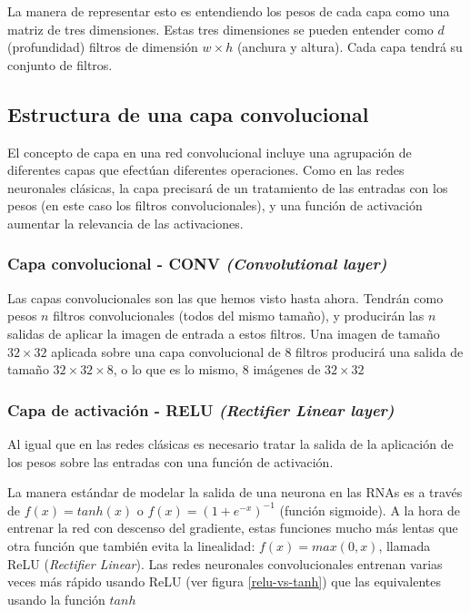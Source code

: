 La manera de representar esto es entendiendo los pesos de cada capa como una matriz de tres dimensiones. Estas tres dimensiones se pueden entender como $d$ (profundidad) filtros de dimensión  $w \times h$ (anchura y altura). Cada capa tendrá su conjunto de filtros.

\subsection{Estructura de una capa convolucional}

El concepto de capa en una red convolucional incluye una agrupación de diferentes capas que efectúan diferentes operaciones. Como en las redes neuronales clásicas, la capa precisará de un tratamiento de las entradas con los pesos (en este caso los filtros convolucionales), y una función de activación aumentar la relevancia de las activaciones. 

\subsubsection{Capa convolucional - CONV \textit{(Convolutional layer)}}

Las capas convolucionales son las que hemos visto hasta ahora. Tendrán como pesos $n$ filtros convolucionales (todos del mismo tamaño), y producirán las $n$ salidas de aplicar la imagen de entrada a estos filtros. Una imagen de tamaño $32\times 32$ aplicada sobre una capa convolucional de 8 filtros producirá una salida de tamaño $32 \times 32 \times 8$, o lo que es lo mismo, 8 imágenes de $32 \times 32$

\subsubsection{Capa de activación - RELU \textit{(Rectifier Linear layer)}}
\label{sec:relu}

Al igual que en las redes clásicas es necesario tratar la salida de la aplicación de los pesos sobre las entradas con una función de activación. 

La manera estándar de modelar la salida de una neurona en las RNAs es a través de $f(x) = tanh(x)$ o $f(x) = (1 + e^{-x})^{-1}$ (función sigmoide). A la hora de entrenar la red con descenso del gradiente, estas funciones mucho más lentas que otra función que también evita la linealidad: $f(x) = max(0, x)$, llamada ReLU (\textit{Rectifier Linear}). Las redes neuronales convolucionales entrenan varias veces más rápido usando ReLU (ver figura \ref{relu-vs-tanh}) que las equivalentes usando la función $tanh$ \parencite{krizhevsky2012imagenet}

